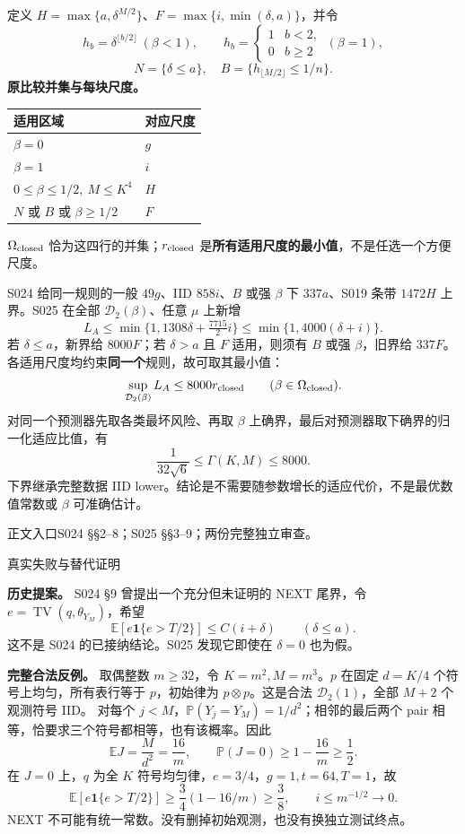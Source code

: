 \documentclass[11pt,a4paper]{article}
\newcommand{\TV}{\operatorname{TV}}\newcommand{\E}{\mathbb E}\newcommand{\Prob}{\mathbb P}
\newcommand{\head}[2]{{\small\sffamily #1}\par\vspace{2pt}{\LARGE\bfseries #2}\par\vspace{5pt}}
\newcommand{\entry}[1]{\vfill{\noindent\small\raggedright 正文入口\quad #1\par}}
\begin{document}
定义 $H=\max\{a,\delta^{M/2}\}$、$F=\max\{i,\min(\delta,a)\}$，并令
\[
 h_b=\delta^{\lfloor b/2\rfloor}\ (\beta<1),\qquad
 h_b=\begin{cases}1&b<2,\\0&b\ge2\end{cases}\ (\beta=1),
\]
\[
 N=\{\delta\le a\},\quad B=\{h_{\lfloor M/2\rfloor}\le1/n\}.
\]
\textbf{原比较并集与每块尺度。}
\begin{center}
\begin{tabularx}{\textwidth}{@{}Xl@{}}\toprule
适用区域 & 对应尺度\\\midrule
$\beta=0$ & $g$\\
$\beta=1$ & $i$\\
$0\le\beta\le1/2,\ M\le K^4$ & $H$\\
$N$ 或 $B$ 或 $\beta\ge1/2$ & $F$\\\bottomrule
\end{tabularx}
\end{center}
$\Omega_{\rm closed}$ 恰为这四行的并集；$r_{\rm closed}$ 是\textbf{所有适用尺度的最小值}，不是任选一个方便尺度。

S024 给同一规则的一般 $49g$、IID $858i$、$B$ 或强 $\beta$ 下 $337a$、S019 条带 $1472H$ 上界。S025 在全部 $\mathcal D_2(\beta)$、任意 $\mu$ 上新增
\[
 L_A\le\min\{1,1308\delta+\tfrac{7715}{2}i\}\le\min\{1,4000(\delta+i)\}.
\]
若 $\delta\le a$，新界给 $8000F$；若 $\delta>a$ 且 $F$ 适用，则须有 $B$ 或强 $\beta$，旧界给 $337F$。各适用尺度均约束\textbf{同一个}规则，故可取其最小值：
\[
 \sup_{\mathcal D_2(\beta)}L_A\le8000r_{\rm closed}\qquad(\beta\in\Omega_{\rm closed}).
\]
对同一个预测器先取各类最坏风险、再取 $\beta$ 上确界，最后对预测器取下确界的归一化适应比值，有
\[
 \frac1{32\sqrt6}\le\Gamma(K,M)\le8000.
\]
下界继承完整数据 IID lower。结论是不需要随参数增长的适应代价，不是最优数值常数或 $\beta$ 可准确估计。
\entry{S024 §§2--8；S025 §§3--9；两份完整独立审查。}
\newpage
\head{真实失败与替代证明}{NEXT 被否定而算法保持不变}
\textbf{历史提案。} S024 §9 曾提出一个充分但未证明的 NEXT 尾界，令 $e=\TV(q,\theta_{Y_M})$，希望
\[
 \E[e\mathbf1\{e>T/2\}]\le C(i+\delta)\qquad(\delta\le a).
\]
这不是 S024 的已接纳结论。S025 发现它即使在 $\delta=0$ 也为假。

\textbf{完整合法反例。} 取偶整数 $m\ge32$，令 $K=m^2,M=m^3$。$p$ 在固定 $d=K/4$ 个符号上均匀，所有表行等于 $p$，初始律为 $p\otimes p$。这是合法 $\mathcal D_2(1)$，全部 $M+2$ 个观测符号 IID。
对每个 $j<M$，$\Prob(Y_j=Y_M)=1/d^2$；相邻的最后两个 pair 相等，恰要求三个符号都相等，也有该概率。因此
\[
 \E J=\frac{M}{d^2}=\frac{16}{m},\qquad
 \Prob(J=0)\ge1-\frac{16}{m}\ge\frac12.
\]
在 $J=0$ 上，$q$ 为全 $K$ 符号均匀律，$e=3/4$，$g=1,t=64,T=1$，故
\[
 \E[e\mathbf1\{e>T/2\}]\ge\frac34(1-16/m)\ge\frac38,
 \qquad i\le m^{-1/2}\longrightarrow0.
\]
NEXT 不可能有统一常数。没有删掉初始观测，也没有换独立测试终点。
\end{document}
